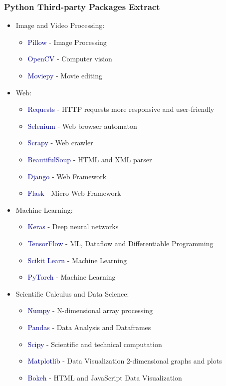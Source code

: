 \begin{frame}[allowframebreaks]\frametitle{Python Third-party Packages Extract}
   \begin{itemize}
      \item Image and Video Processing:
      \begin{itemize}
         \item \textcolor{DarkBlue}{Pillow} - Image Processing
         \item \textcolor{DarkBlue}{OpenCV} - Computer vision
         \item \textcolor{DarkBlue}{Moviepy} - Movie editing
      \end{itemize}
      \vspace{0.3em}

      \item Web:
      \begin{itemize}
         \item \textcolor{DarkBlue}{Requests} - HTTP requests more responsive and user-friendly
         \item \textcolor{DarkBlue}{Selenium} - Web browser automaton
         \item \textcolor{DarkBlue}{Scrapy} - Web crawler
         \item \textcolor{DarkBlue}{BeautifulSoup} - HTML and XML parser
         \item \textcolor{DarkBlue}{Django} - Web Framework
         \item \textcolor{DarkBlue}{Flask} - Micro Web Framework
      \end{itemize}

      \item Machine Learning:
      \begin{itemize}
         \item \textcolor{DarkBlue}{Keras} - Deep neural networks
         \item \textcolor{DarkBlue}{TensorFlow} - ML, Dataflow and Differentiable Programming
         \item \textcolor{DarkBlue}{Scikit Learn} - Machine Learning
         \item \textcolor{DarkBlue}{PyTorch} - Machine Learning
      \end{itemize}
      \vspace{0.3em}

      \item Scientific Calculus and Data Science:
      \begin{itemize}
         \item \textcolor{DarkBlue}{Numpy} - N-dimensional array processing
         \item \textcolor{DarkBlue}{Pandas} - Data Analysis and Dataframes
         \item \textcolor{DarkBlue}{Scipy} - Scientific and technical computation
         \item \textcolor{DarkBlue}{Matplotlib} - Data Visualization 2-dimensional graphs and plots
         \item \textcolor{DarkBlue}{Bokeh} - HTML and JavaScript Data Visualization
      \end{itemize}
      \vspace{0.3em}


\end{itemize}
\end{frame}
